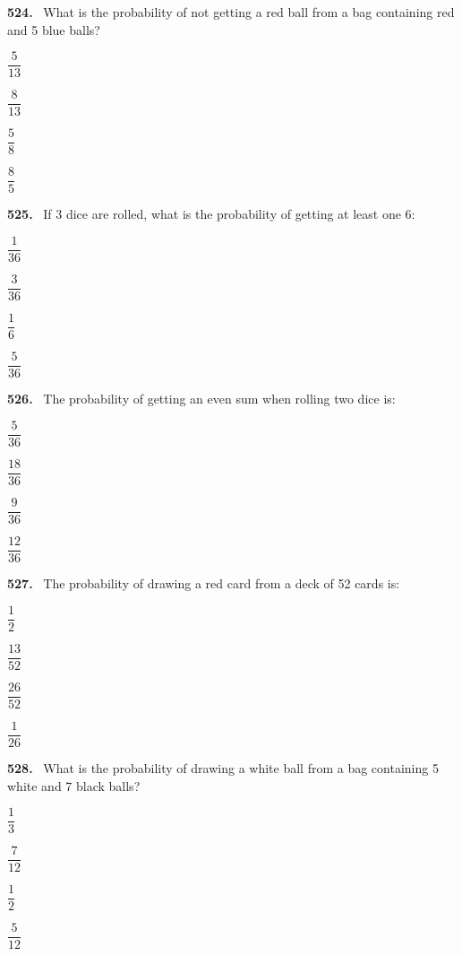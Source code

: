 \documentclass[11pt]{article}
\newenvironment{qenv}[1]{%
  \par\medskip\noindent\textbf{#1.}\ \ignorespaces
}{\par}
\begin{document}
\begin{qenv}{524} What is the probability of not getting a red ball from a bag containing red and 5 blue balls?
\begin{options} \item $\dfrac{5}{13}$ \item $\dfrac{8}{13}$ \item $\dfrac{5}{8}$ \item $\dfrac{8}{5}$ \end{options} \end{qenv}

\begin{qenv}{525} If 3 dice are rolled, what is the probability of getting at least one 6:
\begin{options} \item $\dfrac{1}{36}$ \item $\dfrac{3}{36}$ \item $\dfrac{1}{6}$ \item $\dfrac{5}{36}$ \end{options} \end{qenv}

\begin{qenv}{526} The probability of getting an even sum when rolling two dice is:
\begin{options} \item $\dfrac{5}{36}$ \item $\dfrac{18}{36}$ \item $\dfrac{9}{36}$ \item $\dfrac{12}{36}$ \end{options} \end{qenv}

\begin{qenv}{527} The probability of drawing a red card from a deck of 52 cards is:
\begin{options} \item $\dfrac{1}{2}$ \item $\dfrac{13}{52}$ \item $\dfrac{26}{52}$ \item $\dfrac{1}{26}$ \end{options} \end{qenv}

\begin{qenv}{528} What is the probability of drawing a white ball from a bag containing 5 white and 7 black balls?
\begin{options} \item $\dfrac{1}{3}$ \item $\dfrac{7}{12}$ \item $\dfrac{1}{2}$ \item $\dfrac{5}{12}$ \end{options} \end{qenv}
\end{document}
